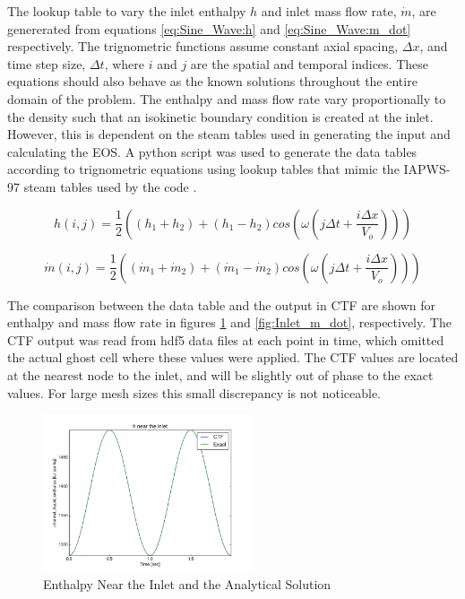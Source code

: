 \documentclass{mc2015}
\begin{document}
The lookup table to vary the inlet enthalpy $h$ and inlet mass
flow rate, $\dot{m}$, are genererated from equations \ref{eq:Sine_Wave:h} and
\ref{eq:Sine_Wave:m_dot} respectively. The trignometric functions assume
constant axial spacing, $\Delta x$, and time step size, $\Delta t$, where $i$
and $j$ are the spatial and temporal indices. These equations should also
behave as the known solutions throughout the entire domain of the problem. The
enthalpy and mass flow rate vary proportionally to the density such that an
isokinetic boundary condition is created at the inlet. However, this is
dependent on the steam tables used in generating the input and calculating the
EOS. A python script was used to generate the data tables according to
trignometric equations using lookup tables that mimic the IAPWS-97 steam tables
used by the code \cite{IAPWS}.

\begin{equation}
	\label{eq:Sine_Wave:h}
	h(i,j) = \frac{1}{2} \left( 
			(h_{1}+h_{2}) + (h_{1}-h_{2}) cos\left(
				\omega \left( j \Delta t + \frac{i \Delta x}{V_{o}} \right)
				\right)
			\right)
\end{equation}

\begin{equation}
	\label{eq:Sine_Wave:m_dot}
	\dot{m}(i,j) = \frac{1}{2} \left( 
			(\dot{m}_{1}+\dot{m}_{2}) + (\dot{m}_{1}-\dot{m}_{2}) cos\left(
				\omega \left( j \Delta t + \frac{i \Delta x}{V_{o}} \right)
				\right)
			\right)
\end{equation}


The comparison between the data table and the output in CTF are shown for
enthalpy and mass flow rate in figures \ref{fig:Inlet_h} and
\ref{fig:Inlet_m_dot}, respectively. The CTF output was read from hdf5 data
files at each point in time, which omitted the actual ghost cell where these values
were applied. The CTF values are located at the nearest node to the inlet, and
will be slightly out of phase to the exact values. For large mesh sizes this
small discrepancy is not noticeable.

\begin{figure}[!h]
	\centering
	\includegraphics[width=0.55\textwidth]{images/Code_Verification/run_00_00/residual/results/Inlet_h}
	\caption{Enthalpy Near the Inlet and the Analytical Solution}
	\label{fig:Inlet_h}
\end{figure}
\end{document}
